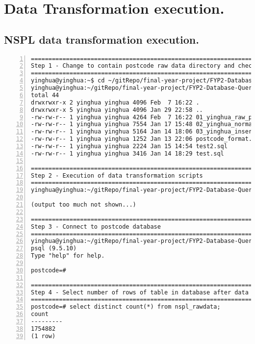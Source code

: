 \section{Data Transformation execution.}

\subsection{NSPL data transformation execution.}

\lstset{basicstyle=\ttfamily\tiny}  
\begin{lstlisting}[breaklines, frame=single, numbers=left, caption={Execution of PL/pgSQL's scripts for NSPL data transformation.}, label=commandline-02]
========================================================================================
Step 1 - Change to contain postcode raw data directory and check the location of scripts
========================================================================================
yinghua@yinghua:~$ cd ~/gitRepo/final-year-project/FYP2-Database-Queries/postcode-database-queries
yinghua@yinghua:~/gitRepo/final-year-project/FYP2-Database-Queries/postcode-database-queries$ ls -al
total 44
drwxrwxr-x 2 yinghua yinghua 4096 Feb  7 16:22 .
drwxrwxr-x 5 yinghua yinghua 4096 Jan 29 22:58 ..
-rw-rw-r-- 1 yinghua yinghua 4264 Feb  7 16:22 01_yinghua_raw_postcode_DDL.sql     <- This script 
-rw-rw-r-- 1 yinghua yinghua 7554 Jan 17 15:48 02_yinghua_normalized_NSPL_DDL.sql
-rw-rw-r-- 1 yinghua yinghua 5164 Jan 14 18:06 03_yinghua_insert_NSPL_table.sql
-rw-rw-r-- 1 yinghua yinghua 1252 Jan 13 22:06 postcode_format.sql
-rw-rw-r-- 1 yinghua yinghua 2224 Jan 15 14:54 test2.sql
-rw-rw-r-- 1 yinghua yinghua 3416 Jan 14 18:29 test.sql

========================================================================================
Step 2 - Execution of data transformation scripts 
========================================================================================
yinghua@yinghua:~/gitRepo/final-year-project/FYP2-Database-Queries/postcode-database-queries$ psql -U yinghua -d postcode -a -f 01_yinghua_raw_postcode_DDL.sql

(output too much not shown...) 

========================================================================================
Step 3 - Connect to postcode database
========================================================================================
yinghua@yinghua:~/gitRepo/final-year-project/FYP2-Database-Queries/postcode-database-queries$ psql postcode; 
psql (9.5.10)
Type "help" for help.

postcode=# 

========================================================================================
Step 4 - Select number of rows of table in database after data transformation
========================================================================================
postcode=# select distinct count(*) from nspl_rawdata; 
count  
---------
1754882
(1 row)

\end{lstlisting}

